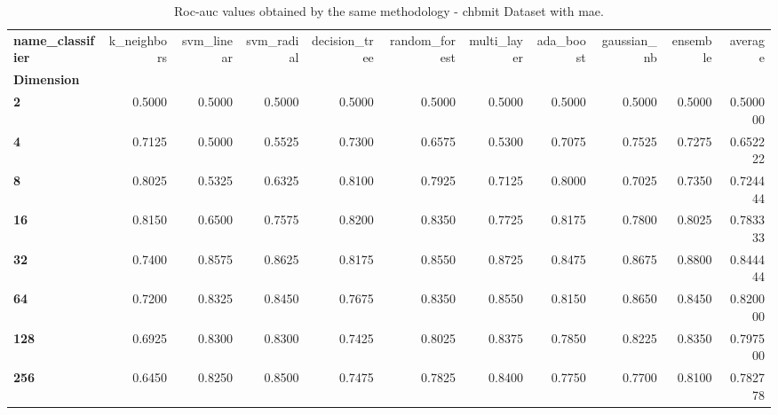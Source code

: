 \begin{table}
\centering
\caption{Roc-auc values obtained by the same methodology - chbmit Dataset with mae.}
\label{roc-auc_chbmit_mae-reproduction}
\begin{tabular}{lrrrrrrrrrr}
\toprule
\textbf{name\_classifier} &  k\_neighbors &  svm\_linear &  svm\_radial &  decision\_tree &  random\_forest &  multi\_layer &  ada\_boost &  gaussian\_nb &  ensemble &   average \\
\textbf{Dimension} &              &             &             &                &                &              &            &              &           &           \\
\midrule
\textbf{2        } &       0.5000 &      0.5000 &      0.5000 &         0.5000 &         0.5000 &       0.5000 &     0.5000 &       0.5000 &    0.5000 &  0.500000 \\
\textbf{4        } &       0.7125 &      0.5000 &      0.5525 &         0.7300 &         0.6575 &       0.5300 &     0.7075 &       0.7525 &    0.7275 &  0.652222 \\
\textbf{8        } &       0.8025 &      0.5325 &      0.6325 &         0.8100 &         0.7925 &       0.7125 &     0.8000 &       0.7025 &    0.7350 &  0.724444 \\
\textbf{16       } &       0.8150 &      0.6500 &      0.7575 &         0.8200 &         0.8350 &       0.7725 &     0.8175 &       0.7800 &    0.8025 &  0.783333 \\
\textbf{32       } &       0.7400 &      0.8575 &      0.8625 &         0.8175 &         0.8550 &       0.8725 &     0.8475 &       0.8675 &    0.8800 &  0.844444 \\
\textbf{64       } &       0.7200 &      0.8325 &      0.8450 &         0.7675 &         0.8350 &       0.8550 &     0.8150 &       0.8650 &    0.8450 &  0.820000 \\
\textbf{128      } &       0.6925 &      0.8300 &      0.8300 &         0.7425 &         0.8025 &       0.8375 &     0.7850 &       0.8225 &    0.8350 &  0.797500 \\
\textbf{256      } &       0.6450 &      0.8250 &      0.8500 &         0.7475 &         0.7825 &       0.8400 &     0.7750 &       0.7700 &    0.8100 &  0.782778 \\
\bottomrule
\end{tabular}
\end{table}
